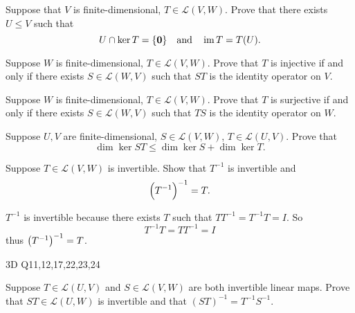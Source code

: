 \begin{prbm}
Suppose that $V$ is finite-dimensional, $T\in\mathcal{L}(V,W)$. Prove that there exists $U\le V$ such that
\[U\cap\ker T=\{\vb{0}\}\quad\text{and}\quad\operatorname{im} T=T(U).\]
\end{prbm}

\begin{solution}

\end{solution}

\begin{prbm}
Suppose $W$ is finite-dimensional, $T\in\mathcal{L}(V,W)$. Prove that $T$ is injective if and only if there exists $S\in\mathcal{L}(W,V)$ such that $ST$ is the identity operator on $V$.
\end{prbm}

\begin{solution}

\end{solution}

\begin{prbm}
Suppose $W$ is finite-dimensional, $T\in\mathcal{L}(V,W)$. Prove that $T$ is surjective if and only if there exists $S\in\mathcal{L}(W,V)$ such that $TS$ is the identity operator on $W$.
\end{prbm}

\begin{prbm}
Suppose $U,V$ are finite-dimensional, $S\in\mathcal{L}(V,W)$, $T\in\mathcal{L}(U,V)$. Prove that
\[\dim\ker ST\le\dim\ker S+\dim\ker T.\]
\end{prbm}

\begin{solution}

\end{solution}

\begin{prbm}
Suppose $T\in\mathcal{L}(V,W)$ is invertible. Show that $T^{-1}$ is invertible and
\[\left(T^{-1}\right)^{-1}=T.\]
\end{prbm}

\begin{solution}
$T^{-1}$ is invertible because there exists $T$ such that $TT^{-1}=T^{-1}T=I$. So
\[T^{-1}T=TT^{-1}=I\]
thus $\left(T^{-1}\right)^{-1}=T$.
\end{solution}

3D Q11,12,17,22,23,24

\begin{prbm}
Suppose $T\in\mathcal{L}(U,V)$ and $S\in\mathcal{L}(V,W)$ are both invertible linear maps. Prove that $ST\in\mathcal{L}(U,W)$ is invertible and that $(ST)^{-1}=T^{-1}S^{-1}$.
\end{prbm}


